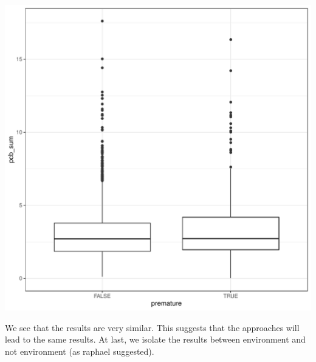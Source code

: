 \documentclass{article}\usepackage[]{graphicx}\usepackage[]{color}
\makeatletter
\def\maxwidth{ %
  \ifdim\Gin@nat@width>\linewidth
    \linewidth
  \else
    \Gin@nat@width
  \fi
}
\newenvironment{kframe}{%
 \def\at@end@of@kframe{}%
 \ifinner\ifhmode%
  \def\at@end@of@kframe{\end{minipage}}%
  \begin{minipage}{\columnwidth}%
 \fi\fi%
 \def\FrameCommand##1{\hskip\@totalleftmargin \hskip-\fboxsep
 \colorbox{shadecolor}{##1}\hskip-\fboxsep
     \hskip-\linewidth \hskip-\@totalleftmargin \hskip\columnwidth}%
 \MakeFramed {\advance\hsize-\width
   \@totalleftmargin\z@ \linewidth\hsize
   \@setminipage}}%
 {\par\unskip\endMakeFramed%
 \at@end@of@kframe}
\newenvironment{knitrout}{}{} %
\makeatother
\begin{document}
\begin{knitrout}
\begin{kframe}
{\ttfamily\noindent\color{warningcolor}{\#\# Warning: Removed 1 rows containing non-finite values (stat\_boxplot).}}\end{kframe}
\includegraphics[width=\maxwidth]{figure/unnamed-chunk-11-2} 

\end{knitrout}
We see that the results are very similar. This suggests that the approaches will lead to the same results. 
At last, we isolate the results between environment and not environment (as raphael suggested). 
\end{document}
